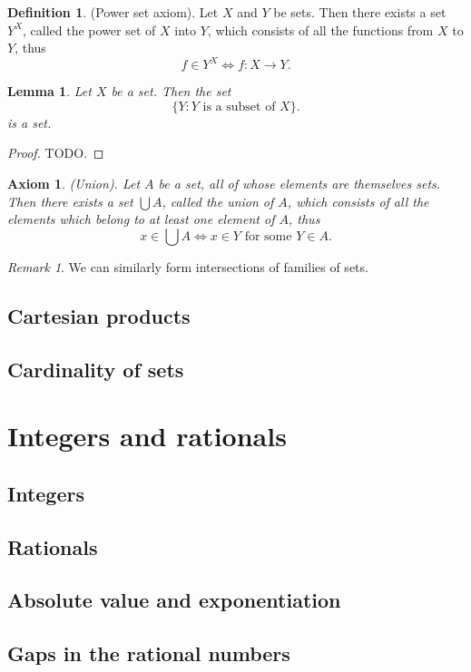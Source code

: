 \documentclass[12pt]{article}
\newtheorem{lemma}[theorem]{Lemma}
\newtheorem{axiom}[theorem]{Axiom}
\theoremstyle{definition}
\newtheorem{definition}[theorem]{Definition}
\theoremstyle{remark}
\newtheorem*{remark}{Remark}
\begin{document}
\begin{definition}
    (Power set axiom). Let $X$ and $Y$ be sets. Then there exists a set $Y^X$, called the power set of $X$ into $Y$, which consists of all the functions from $X$ to $Y$, thus \[
    f \in Y^X \iff f \colon X \to Y
    .\]  
\end{definition}

\begin{lemma}
    Let $X$ be a set. Then the set \[
    \{Y \colon Y \text{ is a subset of } X\}
    .\] is a set.
\end{lemma}

\begin{proof}
    TODO.
\end{proof}

\begin{axiom}
    (Union). Let $A$ be a set, all of whose elements are themselves sets. Then there exists a set $\bigcup A$, called the union of $A$, which consists of all the elements which belong to at least one element of $A$, thus \[
    x \in \bigcup A \iff x \in Y \text{ for some } Y \in A
    .\]
\end{axiom}

\begin{remark}
    We can similarly form intersections of families of sets.
\end{remark}

\subsection{Cartesian products}
\subsection{Cardinality of sets}
\section{Integers and rationals}
\subsection{Integers}
\subsection{Rationals}
\subsection{Absolute value and exponentiation}
\subsection{Gaps in the rational numbers}
\end{document}
